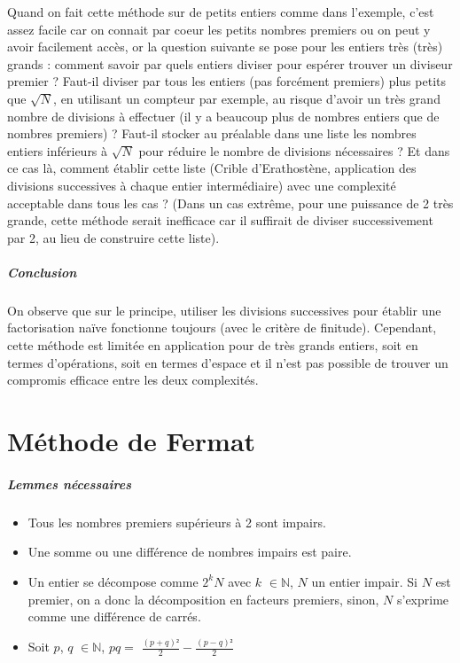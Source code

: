 \documentclass[11pt,a4paper]{article}
\begin{document}
	Quand on fait cette méthode sur de petits entiers comme dans l'exemple, c'est assez facile car on connait par coeur les petits nombres premiers ou on peut y avoir facilement accès, or la question suivante se pose pour les entiers très (très) grands : comment savoir par quels entiers diviser pour espérer trouver un diviseur premier ? Faut-il diviser par tous les entiers (pas forcément premiers) plus petits que $\sqrt{N}$, en utilisant un compteur par exemple, au risque d'avoir un très grand nombre de divisions à effectuer (il y a beaucoup plus de nombres entiers que de nombres premiers) ? Faut-il stocker au préalable dans une liste les nombres entiers inférieurs à $\sqrt{N}$ pour réduire le nombre de divisions nécessaires ? Et dans ce cas là, comment établir cette liste (Crible d'Erathostène, application des divisions successives à chaque entier intermédiaire) avec une complexité acceptable dans tous les cas ? (Dans un cas extrême, pour une puissance de 2 très grande, cette méthode serait inefficace car il suffirait de diviser successivement par 2, au lieu de construire cette liste).
	
	\subparagraph{Conclusion}
	
	On observe que sur le principe, utiliser les divisions successives pour établir une factorisation naïve fonctionne toujours (avec le critère de finitude). Cependant, cette méthode est limitée en application pour de très grands entiers, soit en termes d'opérations, soit en termes d'espace et il n'est pas possible de trouver un compromis efficace entre les deux complexités.
	

	\newpage
	
	\section{\LARGE{Méthode de Fermat}}
	
		\subparagraph{Lemmes nécessaires}
	\begin{itemize}
		\item Tous les nombres premiers supérieurs à 2 sont impairs.
		
		\item Une somme ou une différence de nombres impairs est paire.
		
		\item 	Un entier se décompose comme $2^{k}N$ avec $\mathit{k}$ $\in\mathbb{N}$, $\mathit{N}$ un entier impair. Si $\mathit{N}$ est premier, on a donc la décomposition en facteurs premiers, sinon, $\mathit{N}$ s'exprime comme une différence de carrés.
		
		\item Soit $\mathit{p}$, $\mathit{q}$ $\in\mathbb{N}$, $\mathit{pq = }$ $\frac{(p+q)²}{2} - \frac{(p-q)²}{2}$
	\end{itemize}
		
\end{document}
